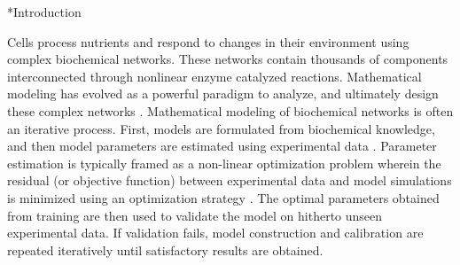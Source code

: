 \documentclass[12pt]{article}
\makeatletter
\renewcommand\section{\@startsection
	{subsection}{2}{0mm}
	{-0.2in}
	{0.05\baselineskip}
	{\normalfont\large\bfseries}}
\makeatother
\begin{document}

\pagebreak

\setcounter{page}{1}

\linenumbers


\section*{Introduction}

Cells process nutrients and respond to changes in their environment using complex biochemical networks. These networks contain thousands of components
interconnected through nonlinear enzyme catalyzed reactions. Mathematical modeling has evolved as a powerful paradigm to analyze, and ultimately design these complex networks \cite{assmus2006dynamics, Riel:2006aa,Jaqaman:2006aa,kitano2002systems,hood2004systems}. Mathematical modeling of biochemical networks is often an iterative process.
First, models are formulated from biochemical knowledge, and then model parameters are estimated using experimental data \cite{Aldridge:2006aa,banga2008optimization,ashyraliyev2009systems}.
Parameter estimation is typically framed as a non-linear optimization problem wherein the residual (or objective function) between experimental data and model simulations is minimized using an optimization strategy \cite{moles2003parameter}. The optimal parameters obtained from training are then used to validate the model on hitherto unseen experimental data. If validation fails, model construction and calibration are repeated iteratively until satisfactory results are obtained.
\end{document}
